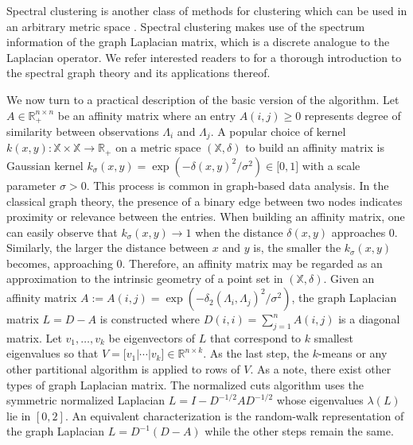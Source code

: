 \documentclass[12pt]{article}
\newcommand{\bbR}{\mathbb{R}}
\newcommand{\bbX}{\mathbb{X}}
\begin{document}
Spectral clustering is another class of methods for clustering which can be used in an arbitrary metric space \citep{von_luxburg_tutorial_2007-1}. Spectral clustering makes use of the spectrum information of the graph Laplacian matrix, which is a discrete analogue to the Laplacian operator. We refer interested readers to \cite{chung_spectral_1997-1} for a thorough introduction to the spectral graph theory and its applications thereof. 

We now turn to a practical description of the basic version of the algorithm. Let $A \in \bbR_{+}^{n\times n}$ be an affinity matrix where an entry $A(i,j)  \geq 0$ represents degree of similarity between observations $\Lambda_i$ and $\Lambda_j$. A popular choice of kernel $k(x,y) : \bbX \times \bbX \rightarrow \bbR_+$ on a metric space $(\bbX, \delta)$ to build an affinity matrix is Gaussian kernel $k_\sigma (x,y) = \exp (-\delta(x,y)^2 / \sigma^2) \in \lbrack 0, 1 \rbrack$ with a scale parameter $\sigma > 0$. This process is common in graph-based data analysis. In the classical graph theory, the presence of a binary edge between two nodes indicates proximity or relevance between the entries. When building an affinity matrix, one can easily observe that $k_\sigma (x,y) \rightarrow 1$ when the distance $\delta (x,y) $ approaches $0$. Similarly, the larger the distance between $x$ and $y$ is, the smaller the $k_\sigma (x,y)$ becomes, approaching 0. Therefore, an affinity matrix may be regarded as an approximation to the intrinsic geometry of a point set in $(\bbX, \delta)$. Given an affinity matrix $A:=A(i,j) = \exp(-\delta_2(\Lambda_i,\Lambda_j)^2 / \sigma^2)$, the graph Laplacian matrix  $L=D-A $ is constructed where $D(i,i) = \sum_{j=1}^n A(i,j)$ is a diagonal matrix. Let $v_1, \ldots, v_k$ be eigenvectors of $L$ that correspond to $k$ smallest eigenvalues so that $V = \lbrack v_1 | \cdots | v_k \rbrack \in \mathbb{R}^{n\times k}$. As the last step, the $k$-means or any other partitional algorithm is applied to rows of $V$. As a note, there exist other types of graph Laplacian matrix. The normalized cuts algorithm \citep{ng_spectral_2001} uses the symmetric normalized Laplacian $L = I - D^{-1/2}AD^{-1/2}$ whose eigenvalues $\lambda(L)$ lie in $[0,2]$. An equivalent characterization is the random-walk representation of the graph Laplacian $L = D^{-1}(D-A)$ \citep{shi_normalized_2000-1} while the other steps remain the same.
\end{document}
